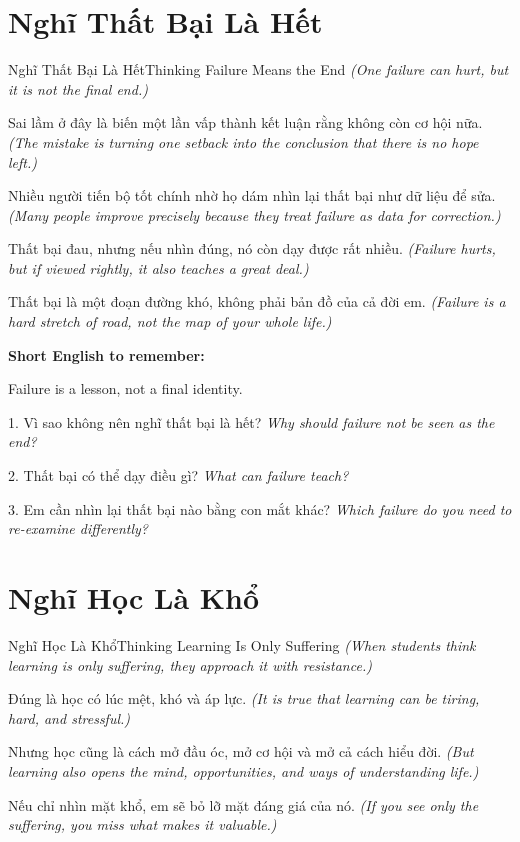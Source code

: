 \section{Nghĩ Thất Bại Là Hết}
\begin{truyen}{Nghĩ Thất Bại Là Hết}{Thinking Failure Means the End}
\textit{(One failure can hurt, but it is not the final end.)}

Sai lầm ở đây là biến một lần vấp thành kết luận rằng không còn cơ hội nữa.
\textit{(The mistake is turning one setback into the conclusion that there is no hope left.)}

Nhiều người tiến bộ tốt chính nhờ họ dám nhìn lại thất bại như dữ liệu để sửa.
\textit{(Many people improve precisely because they treat failure as data for correction.)}

Thất bại đau, nhưng nếu nhìn đúng, nó còn dạy được rất nhiều.
\textit{(Failure hurts, but if viewed rightly, it also teaches a great deal.)}
\end{truyen}

\begin{baihoc}
Thất bại là một đoạn đường khó, không phải bản đồ của cả đời em.
\textit{(Failure is a hard stretch of road, not the map of your whole life.)}
\end{baihoc}

\begin{ghinhoanh}
\textbf{Short English to remember:}

Failure is a lesson, not a final identity.

\end{ghinhoanh}

\begin{tuhocnhanh}
1. Vì sao không nên nghĩ thất bại là hết? \textit{Why should failure not be seen as the end?}

2. Thất bại có thể dạy điều gì? \textit{What can failure teach?}

3. Em cần nhìn lại thất bại nào bằng con mắt khác? \textit{Which failure do you need to re-examine differently?}
\end{tuhocnhanh}
\ngancach

\section{Nghĩ Học Là Khổ}
\begin{truyen}{Nghĩ Học Là Khổ}{Thinking Learning Is Only Suffering}
\textit{(When students think learning is only suffering, they approach it with resistance.)}

Đúng là học có lúc mệt, khó và áp lực.
\textit{(It is true that learning can be tiring, hard, and stressful.)}

Nhưng học cũng là cách mở đầu óc, mở cơ hội và mở cả cách hiểu đời.
\textit{(But learning also opens the mind, opportunities, and ways of understanding life.)}

Nếu chỉ nhìn mặt khổ, em sẽ bỏ lỡ mặt đáng giá của nó.
\textit{(If you see only the suffering, you miss what makes it valuable.)}
\end{truyen}


